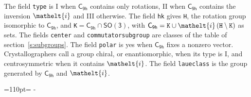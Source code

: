 \documentclass[10pt,a4paper]{article}
\makeatletter
\def\grouprule#1#2{\noalign{\marks\LTgroupmarks{\the\belowrulesep}\nobreak\vskip#1%
  \vskip\aboverulesep}\multispan\LT@cols\unskip{\leaders\hrule\@height#2\hfill\kern\z@}\cr
  \noalign{\penalty\LTrulebreak\vskip\belowrulesep\global\@lastruleclass\z@}}
\newcommand{\needspace}[1]{\par\penalty-100\begingroup\dimen0=#1\relax\dimen2=\pagegoal
  \advance\dimen2-\pagetotal\ifdim\dimen0>\dimen2\relax\ifdim\dimen2>0pt\vfil\break\fi\fi
  \endgroup}
\numberwithin{equation}{section}
\newcommand{\eltfont}[1]{{\let\sigma\eltsigma\mathelt{#1}}}
\newcommand{\grp}[1]{\mathsf{#1}}
\newcommand{\elt}[1]{\eltfont{#1}}
\newcommand{\hmname}[1]{#1}
\newcommand{\orbname}[1]{#1}
\newcommand{\conwayname}[1]{#1}
\newcommand{\igname}[1]{#1}
\newcommand{\olivename}[1]{#1}
\makeatother
\begin{document}
{}
\leavevmode\label{n:element.inversion}The field \texttt{type} is I when $\grp{C_{9h}}$ contains only rotations, II when $\grp{C_{9h}}$ contains the inversion $\elt{i}$ and III otherwise. The field \texttt{hk} gives \texttt{H}, the rotation group isomorphic to $\grp{C_{9h}}$, and \texttt{K}${} = \grp{C_{9h}} \cap \grp{SO(3)}$, with $\grp{C_{9h}} = \texttt{K} \cup \elt{i}\,(\texttt{H} \setminus \texttt{K})$ as sets. The fields \texttt{center} and \texttt{commutatorsubgroup} are classes of the table of section~\ref{s:subgroups}. The field \texttt{polar} is yes when $\grp{C_{9h}}$ fixes a nonzero vector. Crystallographers call a group chiral, or enantiomorphic, when its type is I, and centrosymmetric when it contains $\elt{i}$. The field \texttt{laueclass} is the group generated by $\grp{C_{9h}}$ and $\elt{i}$.
\needspace{110pt}
\end{document}

